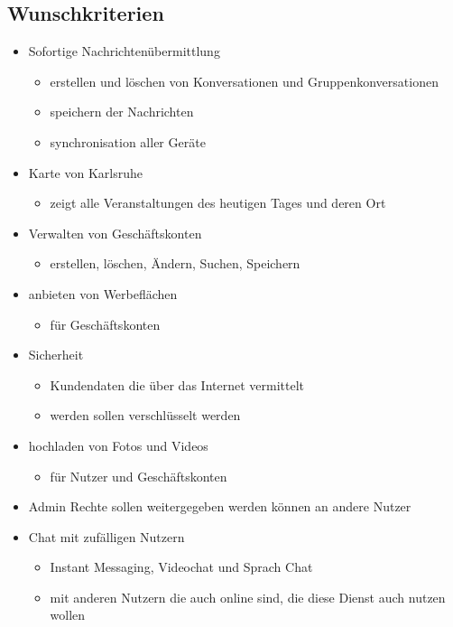 \documentclass[parskip=full]{scrartcl}
\begin{document}
	\subsection{Wunschkriterien}
	\begin{itemize}[nosep]
		\item Sofortige Nachrichtenübermittlung
		\begin{itemize}
			\item erstellen und löschen von Konversationen und Gruppenkonversationen
			\item speichern der Nachrichten
			\item synchronisation aller Geräte
		\end{itemize}

		\item Karte von Karlsruhe
		\begin{itemize}
			\item zeigt alle Veranstaltungen des heutigen Tages und deren Ort
		\end{itemize}
		\item Verwalten von Geschäftskonten
		\begin{itemize}
			\item erstellen, löschen, Ändern, Suchen, Speichern
		\end{itemize}
		\item anbieten von Werbeflächen
		\begin{itemize}
			\item für Geschäftskonten
		\end{itemize}
		\item Sicherheit
		\begin{itemize}
			\item Kundendaten die über das Internet vermittelt \item werden sollen verschlüsselt werden
		\end{itemize}
		\item hochladen von Fotos und Videos
		\begin{itemize}
			\item für Nutzer und Geschäftskonten
		\end{itemize}
		\item Admin Rechte sollen weitergegeben werden können an andere Nutzer
		\item Chat mit zufälligen Nutzern
		\begin{itemize}
			\item Instant Messaging, Videochat und Sprach Chat
			\item mit anderen Nutzern die auch online sind, die diese Dienst auch nutzen wollen

\end{itemize}
\end{itemize}
\end{document}
